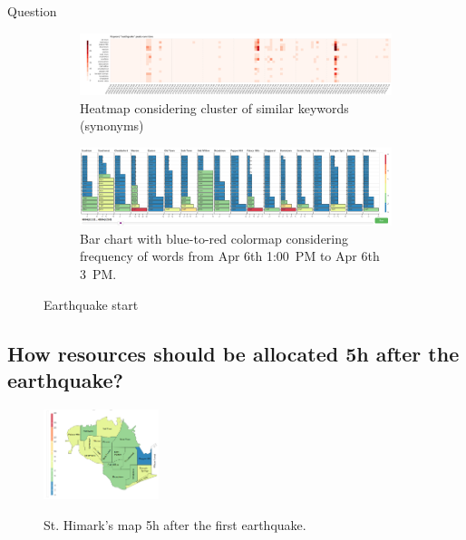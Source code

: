 \documentclass{article}
\begin{document}
\begin{section}{Question}
\begin{figure}[!h]
    \centering
    \begin{subfigure}[!h]{0.95\textwidth}
        \centering
        \includegraphics[width=1.00\textwidth]{figs/eq_start_heat.png}
        \caption{Heatmap considering cluster of similar keywords (synonyms)}
        \label{fig:eq_start_heat}
    \vspace{12pt}
    \end{subfigure}
    \begin{subfigure}[!h]{0.95\textwidth}
        \centering
        \includegraphics[width=1.00\textwidth]{figs/eq_start_hbar.png}
        \caption{Bar chart with blue-to-red colormap considering frequency of
        words from Apr 6th 1:00~PM to Apr 6th 3~PM.}
        \label{fig:eq_start_hbar}
    \end{subfigure}
    \caption{Earthquake start}
    \label{fig:eq_start}
\end{figure}

\subsection{How resources should be allocated 5h after the earthquake?}

\begin{figure}[!h]
    \centering
    \includegraphics[width=0.30\textwidth]{figs/cond_5h/cond_5h_svg.png}
    \label{fig:map_5h}
    \caption{St. Himark's map 5h after the first earthquake.}
\end{figure}


\end{section}
\end{document}
